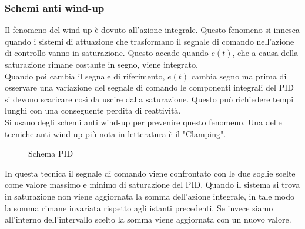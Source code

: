 \subsubsection{Schemi anti wind-up}
Il fenomeno del wind-up è dovuto all’azione integrale. Questo fenomeno si innesca quando i sistemi di attuazione che trasformano il segnale di comando nell’azione di controllo vanno in saturazione. Questo accade quando $e(t)$, che a causa della saturazione  rimane costante in segno, viene integrato.\\
Quando poi cambia il segnale di riferimento, $e(t)$ cambia segno ma prima di osservare una variazione del segnale di comando le componenti integrali del PID si devono scaricare così da uscire dalla saturazione. Questo può richiedere tempi lunghi con una conseguente perdita di reattività. \\
Si usano degli schemi anti wind-up per prevenire questo fenomeno. Una delle tecniche anti wind-up più nota in letteratura  è il  "Clamping". \\
 \begin{figure} [H]
    \centering
    \fontsize{8}{10}\selectfont
    
    \caption{Schema PID}
    \label{img:antiwindup}
\end{figure}
\noindent
In questa tecnica il segnale di comando viene confrontato con le due soglie scelte come valore massimo e minimo di saturazione del PID. Quando il sistema si trova in saturazione non viene aggiornata la somma dell'azione integrale, in tale modo la somma rimane invariata rispetto agli istanti precedenti. Se invece siamo all'interno dell'intervallo scelto la somma viene aggiornata con un nuovo valore. 
